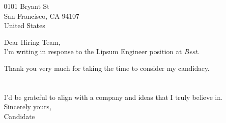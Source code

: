\documentclass[a4paper]{resume-cv}
\begin{document}

\maketitlearea{-}{}

\vfill
\begin{minipage}[t]{\textwidth}
    0101 Bryant St\\
    San Francisco, CA 94107\\
    United States
\end{minipage}

\todaysdate

\vfill
\begin{minipage}[t]{\textwidth}
    \sectionsep
    \fontsize{12pt}{14pt}\selectfont %

    Dear Hiring Team,
    \sectionsep\\

    I'm writing in response to the Lipsum Engineer position at \textit{Best}. \par Thank you very much for taking the time to consider my candidacy. 
    \subsectionsep\\
    
    \blindtext
    \\

    \blindtext
    \\

    I'd be grateful to align with a company and ideas that I truly believe in. 
    \subsectionsep\\

    Sincerely yours,
    \subsectionsep\\

    Candidate 
\end{minipage}
\vfill
\end{document}
